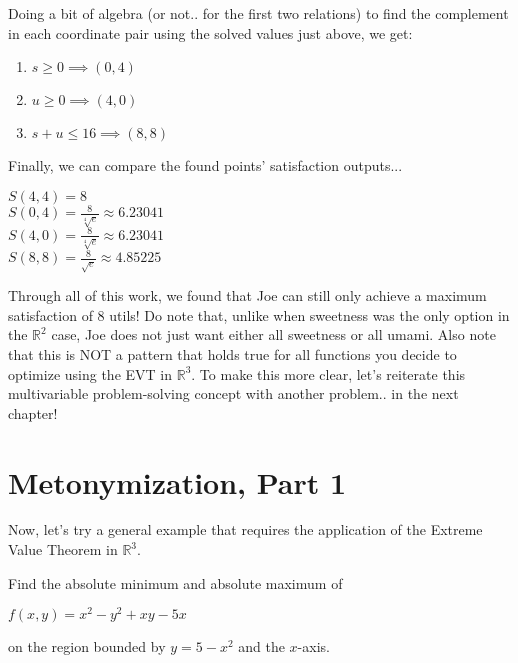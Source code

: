 \pagebreak
Doing a bit of algebra (or not.. for the first two relations) to find the complement in each coordinate pair using the solved values just above, we get:
\begin{enumerate}
	\item $s\geq 0\implies (0, 4)$
	\item $u\geq 0\implies (4, 0)$
	\item $s+u\leq 16\implies (8, 8)$
\end{enumerate}

Finally, we can compare the found points' satisfaction outputs...
\begin{center}
	$S(4, 4) = 8$\\
	$S(0, 4) = \frac{8}{\sqrt[4]{e}}\approx 6.23041$\\
	$S(4, 0) = \frac{8}{\sqrt[4]{e}}\approx 6.23041$\\
	$S(8, 8) = \frac{8}{\sqrt{e}}\approx 4.85225$
\end{center}

Through all of this work, we found that Joe can still only achieve a maximum satisfaction of $8$ utils!
Do note that, unlike when sweetness was the only option in the $\mathbb{R}^2$ case, Joe does not just want either all sweetness or all umami.
Also note that this is NOT a pattern that holds true for all functions you decide to optimize using the EVT in $\mathbb{R}^3$.
To make this more clear, let's reiterate this multivariable problem-solving concept with another problem.. in the next chapter!
\setcounter{chapter}{4}
\chapter{Metonymization, Part 1}
Now, let's try a general example that requires the application of the Extreme Value Theorem in $\mathbb{R}^3$.
\begin{eg}
	Find the absolute minimum and absolute maximum of
	\begin{center}
		$f(x, y) = x^2 - y^2 + xy - 5x$
	\end{center}
	on the region bounded by $y = 5 - x^2$ and the $x$-axis.
\end{eg}
